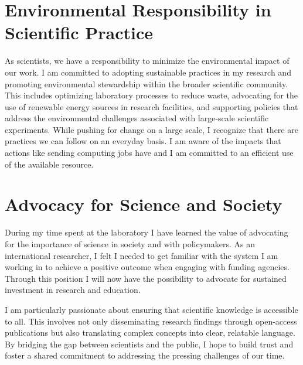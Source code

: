 {\begin{flushleft}
\section{Environmental Responsibility in Scientific Practice}
\vspace{\baselineskip}
As scientists, we have a responsibility to minimize the environmental impact of our work. I am committed to adopting sustainable practices in my research and promoting environmental stewardship within the broader scientific community. This includes optimizing laboratory processes to reduce waste, advocating for the use of renewable energy sources in research facilities, and supporting policies that address the environmental challenges associated with large-scale scientific experiments. While pushing for change on a large scale, I recognize that there are practices we can follow on an everyday basis. I am aware of the impacts that actions like sending computing jobs have and I am committed to an efficient use of the available resource.


\vspace{\baselineskip}
\section{Advocacy for Science and Society}
\vspace{\baselineskip}

During my time spent at the laboratory I have learned the value of advocating for the importance of science in society and with policymakers. 
As an international researcher, I felt I needed to get familiar with the system I am working in to achieve a positive outcome when engaging with funding agencies. Through this position I  will now have the possibility to advocate for sustained investment in research and education.

I am particularly passionate about ensuring that scientific knowledge is accessible to all. This involves not only disseminating research findings through open-access publications but also translating complex concepts into clear, relatable language. By bridging the gap between scientists and the public, I hope to build trust and foster a shared commitment to addressing the pressing challenges of our time.


\end{flushleft}}
